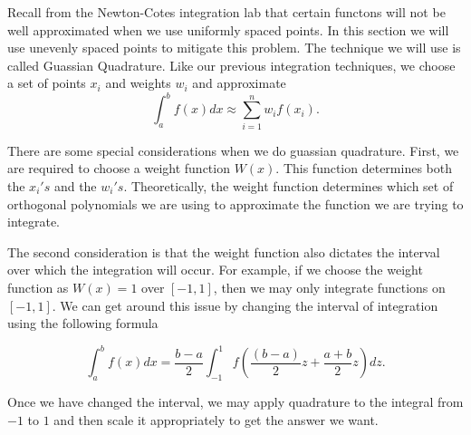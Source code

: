 
\label{Lab:GaussQuad}

Recall from the Newton-Cotes integration lab that certain functons will not be well approximated when we use uniformly spaced points.  In this section we will use unevenly spaced points to mitigate this problem. The technique we will use is called Guassian Quadrature.  Like our previous integration techniques, we choose a set of points $x_i$ and weights $w_i$ and approximate
\[
\int_{a}^b f(x) dx \approx \sum_{i=1}^n w_if(x_i).
\]

There are some special considerations when we do guassian quadrature.  First, we are required to choose a weight function $W(x)$.  This function determines both the $x_i's$ and the $w_i's$.  Theoretically, the weight function determines which set of orthogonal polynomials we are using to approximate the function we are trying to integrate.

The second consideration is that the weight function also dictates the interval over which the integration will occur.  For example, if we choose the weight function as $W(x) = 1$ over $[-1,1]$, then we may only integrate functions on $[-1,1]$.  We can get around this issue by changing the interval of integration using the following formula

\[
\int_a^b f(x) dx = \frac{b-a}{2}\int_{-1}^1 f(\frac{(b-a)}{2}z + \frac{a+b}{2}z)dz.
\]

Once we have changed the interval, we may apply quadrature to the integral from $-1$ to $1$ and then scale it appropriately to get the answer we want.

